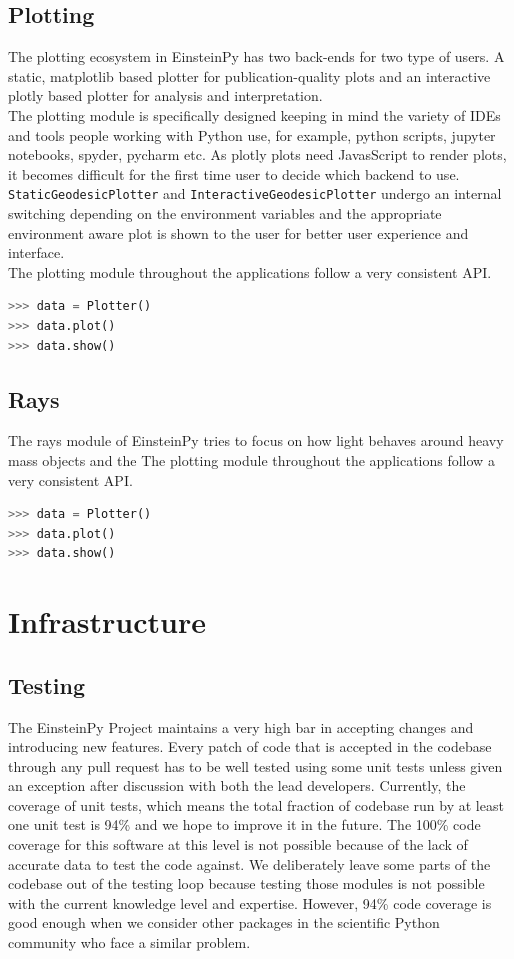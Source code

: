 \documentclass[onecolumn]{aa}
\begin{document}
\subsection{Plotting}
The plotting ecosystem in EinsteinPy has two back-ends for two type of users. A static, matplotlib based plotter for publication-quality plots and an interactive plotly based plotter for analysis and interpretation. \\
The plotting module is specifically designed keeping in mind the variety of IDEs and tools people working with Python use, for example, python scripts, jupyter notebooks, spyder, pycharm etc. As plotly plots need JavasScript to render plots, it becomes difficult for the first time user to decide which backend to use. \texttt{StaticGeodesicPlotter} and \texttt{InteractiveGeodesicPlotter} undergo an internal switching depending on the environment variables and the appropriate environment aware plot is shown to the user for better user experience and interface.\\
The plotting module throughout the applications follow a very consistent API. \begin{lstlisting}[language=Python, caption=Plotting Module API]
>>> data = Plotter()
>>> data.plot()
>>> data.show()
\end{lstlisting}

\subsection{Rays}
The rays module of EinsteinPy tries to focus on how light behaves around heavy mass objects and the 
The plotting module throughout the applications follow a very consistent API. \begin{lstlisting}[language=Python, caption=Plotting Module API]
>>> data = Plotter()
>>> data.plot()
>>> data.show()
\end{lstlisting}


\section{Infrastructure} \label{sec:infra}
\subsection{Testing} \label{subsec:testing}
The EinsteinPy Project maintains a very high bar in accepting changes and introducing new features. Every patch of code that is accepted in the codebase through any pull request has to be well tested using some unit tests unless given an exception after discussion with both the lead developers. Currently, the coverage of unit tests, which means the total fraction of codebase run by at least one unit test is 94\% and we hope to improve it in the future. The 100\% code coverage for this software at this level is not possible because of the lack of accurate data to test the code against. We deliberately leave some parts of the codebase out of the testing loop because testing those modules is not possible with the current knowledge level and expertise. However, 94\% code coverage is good enough when we consider other packages in the scientific Python community who face a similar problem.  
\end{document}
